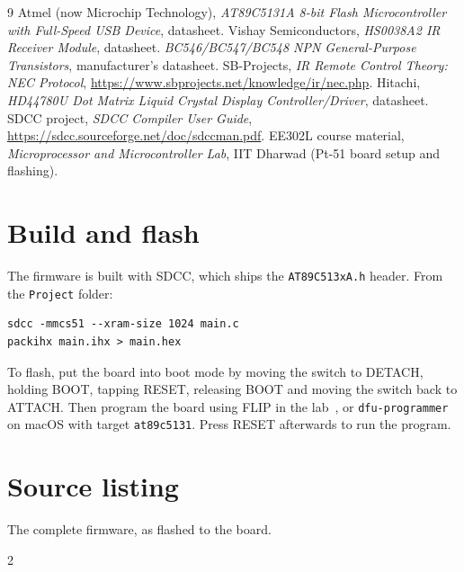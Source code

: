 \documentclass[11pt,a4paper]{article}
\newcommand{\code}[1]{\texttt{#1}}
\begin{document}
\begin{thebibliography}{9}
 Atmel (now Microchip Technology), \emph{AT89C5131A 8-bit Flash Microcontroller with Full-Speed USB Device}, datasheet.
 Vishay Semiconductors, \emph{HS0038A2 IR Receiver Module}, datasheet.
 \emph{BC546/BC547/BC548 NPN General-Purpose Transistors}, manufacturer's datasheet.
 SB-Projects, \emph{IR Remote Control Theory: NEC Protocol}, \url{https://www.sbprojects.net/knowledge/ir/nec.php}.
 Hitachi, \emph{HD44780U Dot Matrix Liquid Crystal Display Controller/Driver}, datasheet.
 SDCC project, \emph{SDCC Compiler User Guide}, \url{https://sdcc.sourceforge.net/doc/sdccman.pdf}.
 EE302L course material, \emph{Microprocessor and Microcontroller Lab}, IIT Dharwad (Pt-51 board setup and flashing).
\end{thebibliography}

\appendix

\section{Build and flash}

The firmware is built with SDCC, which ships the \code{AT89C513xA.h} header. From the \code{Project} folder:

\begin{lstlisting}[style=dump]
sdcc -mmcs51 --xram-size 1024 main.c
packihx main.ihx > main.hex
\end{lstlisting}

To flash, put the board into boot mode by moving the switch to DETACH, holding BOOT, tapping RESET, releasing BOOT and moving the switch back to ATTACH. Then program the board using FLIP in the lab~\cite{deck}, or \code{dfu-programmer} on macOS with target \code{at89c5131}. Press RESET afterwards to run the program.

\newpage
\section{Source listing}
\label{app:source}

The complete firmware, as flashed to the board.

\begin{multicols}{2}

\end{multicols}
\end{document}
